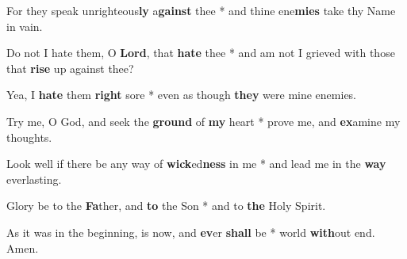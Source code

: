\begin{multicols}{2}
	For they speak unrighteous\textbf{ly} a\textbf{gainst} thee * and thine ene\textbf{mies} take thy Name in vain.
	
	Do not I hate them, O \textbf{Lord}, that \textbf{hate} thee * and am not I grieved with those that \textbf{rise} up against thee?
	
	Yea, I \textbf{hate} them \textbf{right} sore * even as though \textbf{they} were mine enemies.
	
	Try me, O God, and seek the \textbf{ground} of \textbf{my} heart * prove me, and \textbf{ex}amine my thoughts.
	
	Look well if there be any way of \textbf{wick}ed\textbf{ness} in me * and lead me in the \textbf{way} everlasting.
	
	Glory be to the \textbf{Fa}ther, and \textbf{to} the Son * and to \textbf{the} Holy Spirit.
	
	As it was in the beginning, is now, and \textbf{ev}er \textbf{shall} be * world \textbf{with}out end. Amen.
\end{multicols}